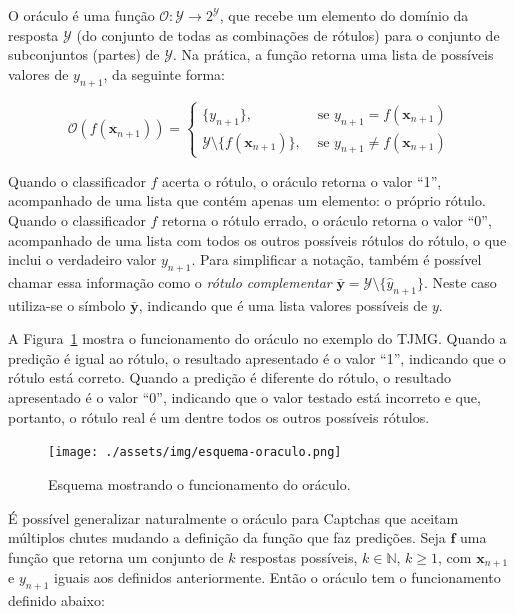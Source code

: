 \documentclass[12pt,twoside,brazilian]{book}
\begin{document}
O oráculo é uma função
\(\mathcal O: \mathcal Y \rightarrow 2^{\mathcal Y}\), que recebe um
elemento do domínio da resposta \(\mathcal Y\) (do conjunto de todas as
combinações de rótulos) para o conjunto de subconjuntos (partes) de
\(\mathcal Y\). Na prática, a função retorna uma lista de possíveis
valores de \({y}_{n+1}\), da seguinte forma:

\[
\mathcal O(f(\mathbf x_{n+1})) = \left\{\begin{array}{ll}
    \{ y_{n+1}\}, & \text{ se } y_{n+1} = f(\mathbf x_{n+1})  \\
    \mathcal Y \setminus \{f(\mathbf x_{n+1})\}, & \text{ se } y_{n+1} \neq f(\mathbf x_{n+1})
\end{array}\right.
\]

Quando o classificador \(f\) acerta o rótulo, o oráculo retorna o valor
``1'', acompanhado de uma lista que contém apenas um elemento: o próprio
rótulo. Quando o classificador \(f\) retorna o rótulo errado, o oráculo
retorna o valor ``0'', acompanhado de uma lista com todos os outros
possíveis rótulos do rótulo, o que inclui o verdadeiro valor
\(y_{n+1}\). Para simplificar a notação, também é possível chamar essa
informação como o \emph{rótulo complementar}
\(\bar{\mathbf y} = \mathcal Y \setminus \{ \hat {y}_{n+1}\}\). Neste
caso utiliza-se o símbolo \(\bar{\mathbf y}\), indicando que é uma lista
valores possíveis de \(y\).

A Figura~\ref{fig-esquema-oraculo} mostra o funcionamento do oráculo no
exemplo do TJMG. Quando a predição é igual ao rótulo, o resultado
apresentado é o valor ``1'', indicando que o rótulo está correto. Quando
a predição é diferente do rótulo, o resultado apresentado é o valor
``0'', indicando que o valor testado está incorreto e que, portanto, o
rótulo real é um dentre todos os outros possíveis rótulos.

\begin{figure}

{\centering \texttt{[image: ./assets/img/esquema-oraculo.png]}

}

\caption{\label{fig-esquema-oraculo}Esquema mostrando o funcionamento do
oráculo.}

\end{figure}

É possível generalizar naturalmente o oráculo para Captchas que aceitam
múltiplos chutes mudando a definição da função que faz predições. Seja
\(\mathbf f\) uma função que retorna um conjunto de \(k\) respostas
possíveis, \(k\in \mathbb N\), \(k\geq 1\), com \(\mathbf x_{n+1}\) e
\(y_{n+1}\) iguais aos definidos anteriormente. Então o oráculo tem o
funcionamento definido abaixo:
\end{document}
